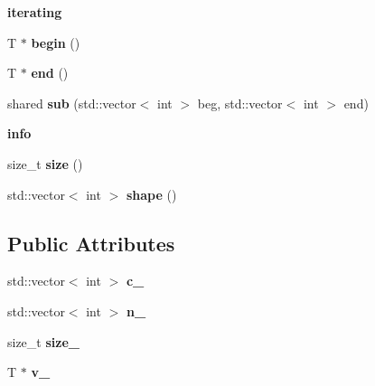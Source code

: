 \begin{Indent}{\bf iterating}\par
{\em \label{_amgrpc920236de44765917757f8b46bb8ccda}
 }\begin{DoxyCompactItemize}
\item 
\hypertarget{class____array_a9e073ed33e0fad10acbbb001af3c10b1}{
T $\ast$ {\bfseries begin} ()}
\label{class____array_a9e073ed33e0fad10acbbb001af3c10b1}

\item 
\hypertarget{class____array_a0e7f0ce953b4d180a940c14e34b503db}{
T $\ast$ {\bfseries end} ()}
\label{class____array_a0e7f0ce953b4d180a940c14e34b503db}

\item 
\hypertarget{class____array_a0a736891406c46548f11a8707508d7c1}{
shared {\bfseries sub} (std::vector$<$ int $>$ beg, std::vector$<$ int $>$ end)}
\label{class____array_a0a736891406c46548f11a8707508d7c1}

\end{DoxyCompactItemize}
\end{Indent}
\begin{Indent}{\bf info}\par
{\em \label{_amgrpcaf9b6b99962bf5c2264824231d7a40c}
 }\begin{DoxyCompactItemize}
\item 
\hypertarget{class____array_abbc3e2f4041747fdb3de9b224db7cb1e}{
size\_\-t {\bfseries size} ()}
\label{class____array_abbc3e2f4041747fdb3de9b224db7cb1e}

\item 
\hypertarget{class____array_a71abd72aa867f9a4db2fe228897654df}{
std::vector$<$ int $>$ {\bfseries shape} ()}
\label{class____array_a71abd72aa867f9a4db2fe228897654df}

\end{DoxyCompactItemize}
\end{Indent}
\subsection*{Public Attributes}
\begin{DoxyCompactItemize}
\item 
\hypertarget{class____array_aaca68729c0b849ed2f2b5813d97406b4}{
std::vector$<$ int $>$ {\bfseries c\_\-}}
\label{class____array_aaca68729c0b849ed2f2b5813d97406b4}

\item 
\hypertarget{class____array_aa23a824622889b5edab8fcd74d9d2ca8}{
std::vector$<$ int $>$ {\bfseries n\_\-}}
\label{class____array_aa23a824622889b5edab8fcd74d9d2ca8}

\item 
\hypertarget{class____array_a9e84ea9904c281c73d38730bf1c63c6f}{
size\_\-t {\bfseries size\_\-}}
\label{class____array_a9e84ea9904c281c73d38730bf1c63c6f}

\item 
\hypertarget{class____array_acd1bdf7fd0d7c1d9888ec5ab746e4472}{
T $\ast$ {\bfseries v\_\-}}
\label{class____array_acd1bdf7fd0d7c1d9888ec5ab746e4472}

\end{DoxyCompactItemize}
